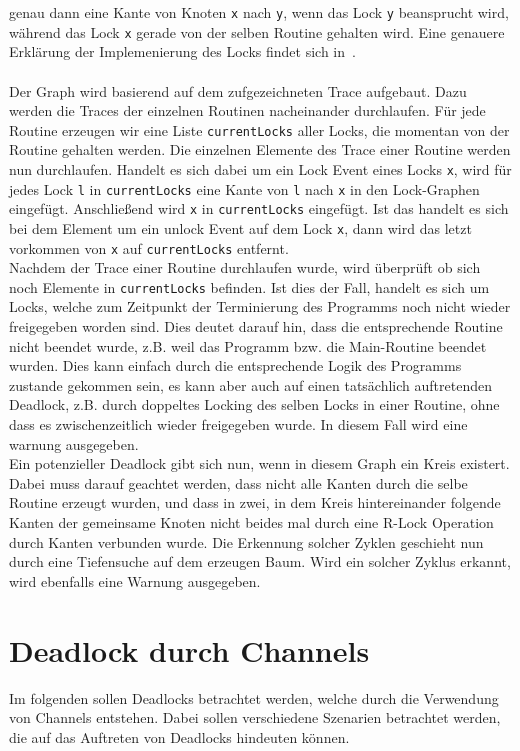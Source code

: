 genau dann eine Kante von Knoten \texttt{x} nach \texttt{y}, wenn das Lock \texttt{y} beansprucht 
wird, während das Lock \texttt{x} gerade von der selben Routine gehalten wird. Eine 
genauere Erklärung der Implemenierung des Locks findet sich in~\cite{bachelor-project}.   \\\\
Der Graph wird basierend auf dem zufgezeichneten Trace aufgebaut. Dazu werden die Traces der 
einzelnen Routinen nacheinander durchlaufen. Für jede Routine erzeugen wir eine Liste \texttt{currentLocks} aller 
Locks, die momentan von der Routine gehalten werden. Die einzelnen Elemente des Trace einer 
Routine werden nun durchlaufen. Handelt es sich dabei um ein Lock Event eines Locks \texttt{x}, wird 
für jedes Lock \texttt{l} in \texttt{currentLocks} eine Kante von \texttt{l} nach \texttt{x} in den 
Lock-Graphen eingefügt. Anschließend wird \texttt{x} in \texttt{currentLocks} eingefügt.
Ist das handelt es sich bei dem Element um ein unlock Event auf dem Lock \texttt{x}, dann wird das 
letzt vorkommen von \texttt{x} auf \texttt{currentLocks} entfernt.\\
Nachdem der Trace einer Routine durchlaufen wurde, wird überprüft ob sich noch Elemente in 
\texttt{currentLocks} befinden. Ist dies der Fall, handelt es sich um Locks, welche zum Zeitpunkt der Terminierung 
des Programms noch nicht wieder freigegeben worden sind. Dies deutet darauf hin, dass die
entsprechende Routine nicht beendet wurde, z.B. weil das Programm bzw. die Main-Routine beendet wurden.
Dies kann einfach durch die entsprechende Logik des Programms zustande gekommen sein, es kann aber auch 
auf einen tatsächlich auftretenden Deadlock, z.B. durch doppeltes Locking des selben Locks in einer Routine, ohne dass 
es zwischenzeitlich wieder freigegeben wurde. In diesem Fall wird eine warnung ausgegeben.\\
Ein potenzieller Deadlock gibt sich nun, wenn in diesem Graph ein Kreis existert. Dabei muss darauf 
geachtet werden, dass nicht alle Kanten durch die selbe Routine erzeugt wurden, und dass in 
zwei, in dem Kreis hintereinander folgende Kanten der gemeinsame Knoten nicht beides mal durch eine 
R-Lock Operation durch Kanten verbunden wurde. Die Erkennung solcher Zyklen geschieht nun durch 
eine Tiefensuche auf dem erzeugen Baum. Wird ein solcher Zyklus erkannt, wird ebenfalls eine 
Warnung ausgegeben.


\section{Deadlock durch Channels}\label{Chap:Analyse-Sec:Channel}
Im folgenden sollen Deadlocks betrachtet werden, welche durch die Verwendung von Channels entstehen. Dabei sollen verschiedene 
Szenarien betrachtet werden, die auf das Auftreten von Deadlocks hindeuten können. 
 

